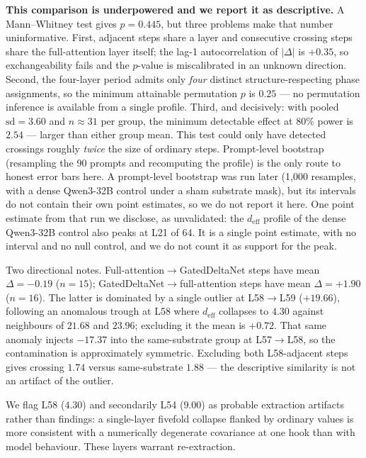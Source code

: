 \textbf{This comparison is underpowered and we report it as
descriptive.} A Mann--Whitney test gives $p{=}0.445$, but three
problems make that number uninformative. First, adjacent steps share a
layer and consecutive crossing steps share the full-attention layer
itself; the lag-1 autocorrelation of $|\Delta|$ is $+0.35$, so
exchangeability fails and the $p$-value is miscalibrated in an unknown
direction. Second, the four-layer period admits only \emph{four}
distinct structure-respecting phase assignments, so the minimum
attainable permutation $p$ is $0.25$ --- no permutation inference is
available from a single profile. Third, and decisively: with pooled
$\text{sd}{=}3.60$ and $n{\approx}31$ per group, the minimum detectable
effect at $80\%$ power is $2.54$ --- larger than either group mean.
This test could only have detected crossings roughly \emph{twice} the
size of ordinary steps. Prompt-level bootstrap (resampling the 90
prompts and recomputing the profile) is the only route to honest error
bars here. A prompt-level bootstrap was run later (1{,}000 resamples, with a dense
Qwen3-32B control under a sham substrate mask), but its intervals do not contain their own point estimates, so we do not report it here.
One point estimate from that run we disclose, as unvalidated: the
$d_\text{eff}$ profile of the dense Qwen3-32B control also peaks at L21
of 64. It is a single point estimate, with no interval and no null
control, and we do not count it as support for the peak.

Two directional notes. Full-attention${\to}$GatedDeltaNet steps have
mean $\Delta{=}{-}0.19$ ($n{=}15$); GatedDeltaNet${\to}$full-attention
steps have mean $\Delta{=}{+}1.90$ ($n{=}16$). The latter is dominated
by a single outlier at L58${\to}$L59 ($+19.66$), following an anomalous
trough at L58 where $d_\text{eff}$ collapses to $4.30$ against
neighbours of $21.68$ and $23.96$; excluding it the mean is $+0.72$.
That same anomaly injects ${-}17.37$ into the same-substrate group at
L57${\to}$L58, so the contamination is approximately symmetric.
Excluding both L58-adjacent steps gives crossing $1.74$ versus
same-substrate $1.88$ --- the descriptive similarity is not an artifact
of the outlier.

We flag L58 ($4.30$) and secondarily L54 ($9.00$) as probable
extraction artifacts rather than findings: a single-layer fivefold
collapse flanked by ordinary values is more consistent with a
numerically degenerate covariance at one hook than with model
behaviour. These layers warrant re-extraction.

